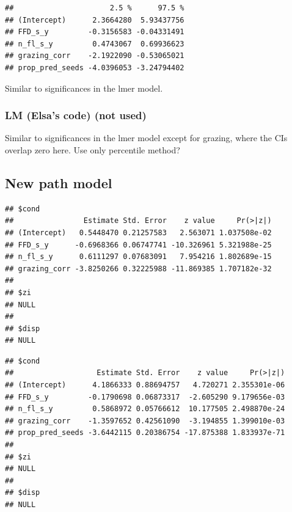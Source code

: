 \documentclass[
]{article}
\newenvironment{Shaded}{\begin{snugshade}}{\end{snugshade}}
\newcommand{\CommentTok}[1]{\textcolor[rgb]{0.56,0.35,0.01}{\textit{#1}}}
\newcommand{\KeywordTok}[1]{\textcolor[rgb]{0.13,0.29,0.53}{\textbf{#1}}}
\newcommand{\NormalTok}[1]{#1}
\newcommand{\OperatorTok}[1]{\textcolor[rgb]{0.81,0.36,0.00}{\textbf{#1}}}
\begin{document}
\begin{verbatim}
##                      2.5 %      97.5 %
## (Intercept)      2.3664280  5.93437756
## FFD_s_y         -0.3156583 -0.04331491
## n_fl_s_y         0.4743067  0.69936623
## grazing_corr    -2.1922090 -0.53065021
## prop_pred_seeds -4.0396053 -3.24794402
\end{verbatim}

Similar to significances in the lmer model.

\hypertarget{lm-elsas-code-not-used}{%
\subsubsection{LM (Elsa's code) (not
used)}\label{lm-elsas-code-not-used}}

Similar to significances in the lmer model except for grazing, where the
CIs overlap zero here. Use only percentile method?

\hypertarget{new-path-model}{%
\subsection{New path model}\label{new-path-model}}

\begin{Shaded}
\end{Shaded}

\begin{verbatim}
## $cond
##                Estimate Std. Error    z value     Pr(>|z|)
## (Intercept)   0.5448470 0.21257583   2.563071 1.037508e-02
## FFD_s_y      -0.6968366 0.06747741 -10.326961 5.321988e-25
## n_fl_s_y      0.6111297 0.07683091   7.954216 1.802689e-15
## grazing_corr -3.8250266 0.32225988 -11.869385 1.707182e-32
## 
## $zi
## NULL
## 
## $disp
## NULL
\end{verbatim}

\begin{Shaded}
\end{Shaded}

\begin{verbatim}
## $cond
##                   Estimate Std. Error    z value     Pr(>|z|)
## (Intercept)      4.1866333 0.88694757   4.720271 2.355301e-06
## FFD_s_y         -0.1790698 0.06873317  -2.605290 9.179656e-03
## n_fl_s_y         0.5868972 0.05766612  10.177505 2.498870e-24
## grazing_corr    -1.3597652 0.42561090  -3.194855 1.399010e-03
## prop_pred_seeds -3.6442115 0.20386754 -17.875388 1.833937e-71
## 
## $zi
## NULL
## 
## $disp
## NULL
\end{verbatim}
\end{document}
